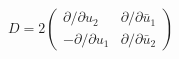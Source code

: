 \begin{equation}
D=2 \left(
\begin{array}{cc}
\partial / \partial u_{2} & \partial / \partial \bar{u}_{1}  \\
-\partial / \partial u_{1} & \partial / \partial \bar{u}_{2}
\end{array}
\right)
\end{equation}

